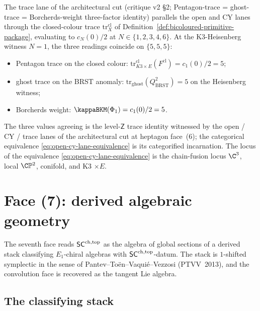 \begin{remark}
\label{rem:three-lanes-face-6}
The trace lane of the architectural cut
\textup(critique v2 \S 2; Pentagon-trace = ghost-trace =
Borcherds-weight three-factor identity\textup) parallels the
open and CY lanes through the closed-colour trace
$\mathrm{tr}^{\mathrm{cl}}_X$ of
Definition~\ref{def:bicoloured-primitive-package}, evaluating to
$c_N(0)/2$ at $N \in \{1, 2, 3, 4, 6\}$. At the K3-Heisenberg
witness $N = 1$, the three readings coincide on
$\{5, 5, 5\}$:
\begin{itemize}
\item Pentagon trace on the closed colour:
$\mathrm{tr}^{\mathrm{cl}}_{K3 \times E}(F^{\mathrm{cl}}) = c_1(0)/2 = 5$;
\item ghost trace on the BRST anomaly:
$\mathrm{tr}_{\mathrm{ghost}}(Q_{\mathrm{BRST}}^2) = 5$ on the
Heisenberg witness;
\item Borcherds weight:
$\kappaBKM(\Phi_1) = c_1(0)/2 = 5$.
\end{itemize}
The three values agreeing is the level-$\mathsf{Z}$ trace identity
witnessed by the open / CY / trace lanes of the architectural cut at
heptagon face~(6); the categorical equivalence
\eqref{eq:open-cy-lane-equivalence} is its categorified incarnation.
The locus of the equivalence \eqref{eq:open-cy-lane-equivalence} is
the chain-fusion locus
$\C^3$, local $\C\mathbb{P}^2$, conifold, and K3 $\times E$.
\end{remark}

\section{Face (7): derived algebraic geometry}
\label{sec:face-dag}

The seventh face reads $\mathsf{SC}^{\mathrm{ch},\mathrm{top}}$ as the algebra of global sections
of a derived stack classifying $E_1$-chiral algebras with
$\mathsf{SC}^{\mathrm{ch},\mathrm{top}}$-datum. The stack is $1$-shifted symplectic in the sense
of Pantev--To\"en--Vaqui\'e--Vezzosi (PTVV~2013), and the convolution
face is recovered as the tangent Lie algebra.

\subsection{The classifying stack}\label{subsec:classifying-stack}

